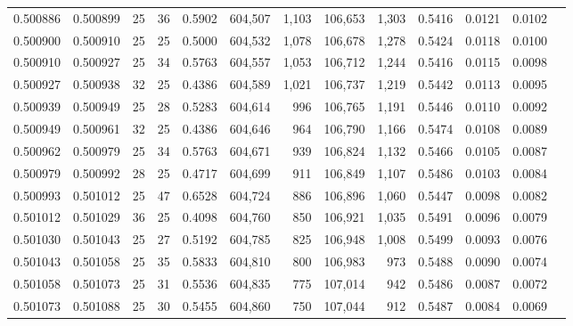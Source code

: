 \begin{tabular}{rrrrrrrrrrrrr}
0.500886 & 0.500899 &    25 &  36 &                                     0.5902 & 604,507 &   1,103 & 106,653 &   1,303 & 0.5416 & 0.0121 & 0.0102 \\
0.500900 & 0.500910 &    25 &  25 &                                     0.5000 & 604,532 &   1,078 & 106,678 &   1,278 & 0.5424 & 0.0118 & 0.0100 \\
0.500910 & 0.500927 &    25 &  34 &                                     0.5763 & 604,557 &   1,053 & 106,712 &   1,244 & 0.5416 & 0.0115 & 0.0098 \\
0.500927 & 0.500938 &    32 &  25 &                                     0.4386 & 604,589 &   1,021 & 106,737 &   1,219 & 0.5442 & 0.0113 & 0.0095 \\
0.500939 & 0.500949 &    25 &  28 &                                     0.5283 & 604,614 &     996 & 106,765 &   1,191 & 0.5446 & 0.0110 & 0.0092 \\
0.500949 & 0.500961 &    32 &  25 &                                     0.4386 & 604,646 &     964 & 106,790 &   1,166 & 0.5474 & 0.0108 & 0.0089 \\
0.500962 & 0.500979 &    25 &  34 &                                     0.5763 & 604,671 &     939 & 106,824 &   1,132 & 0.5466 & 0.0105 & 0.0087 \\
0.500979 & 0.500992 &    28 &  25 &                                     0.4717 & 604,699 &     911 & 106,849 &   1,107 & 0.5486 & 0.0103 & 0.0084 \\
0.500993 & 0.501012 &    25 &  47 &                                     0.6528 & 604,724 &     886 & 106,896 &   1,060 & 0.5447 & 0.0098 & 0.0082 \\
0.501012 & 0.501029 &    36 &  25 &                                     0.4098 & 604,760 &     850 & 106,921 &   1,035 & 0.5491 & 0.0096 & 0.0079 \\
0.501030 & 0.501043 &    25 &  27 &                                     0.5192 & 604,785 &     825 & 106,948 &   1,008 & 0.5499 & 0.0093 & 0.0076 \\
0.501043 & 0.501058 &    25 &  35 &                                     0.5833 & 604,810 &     800 & 106,983 &     973 & 0.5488 & 0.0090 & 0.0074 \\
0.501058 & 0.501073 &    25 &  31 &                                     0.5536 & 604,835 &     775 & 107,014 &     942 & 0.5486 & 0.0087 & 0.0072 \\
0.501073 & 0.501088 &    25 &  30 &                                     0.5455 & 604,860 &     750 & 107,044 &     912 & 0.5487 & 0.0084 & 0.0069 \\

\end{tabular}
